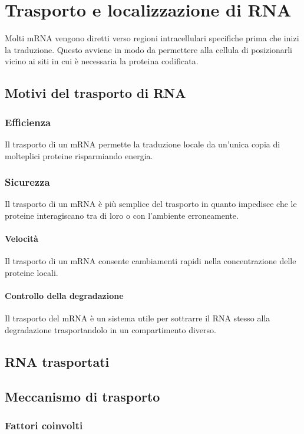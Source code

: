 \chapter{Trasporto e localizzazione di RNA}
Molti mRNA vengono diretti verso regioni intracellulari specifiche prima che inizi la traduzione.
Questo avviene in modo da permettere alla cellula di posizionarli vicino ai siti in cui \`e necessaria la proteina codificata.

\section{Motivi del trasporto di RNA}

	\subsection{Efficienza}
	Il trasporto di un mRNA permette la traduzione locale da un'unica copia di molteplici proteine risparmiando energia.

	\subsection{Sicurezza}
	Il trasporto di un mRNA \`e pi\`u semplice del trasporto in quanto impedisce che le proteine interagiscano tra di loro o con l'ambiente erroneamente.

	\subsubsection{Velocit\`a}
	Il trasporto di un mRNA consente cambiamenti rapidi nella concentrazione delle proteine locali.

	\subsubsection{Controllo della degradazione}
	Il trasporto del mRNA \`e un sistema utile per sottrarre il RNA stesso alla degradazione trasportandolo in un compartimento diverso.

\section{RNA trasportati}

\section{Meccanismo di trasporto}

	\subsection{Fattori coinvolti}

